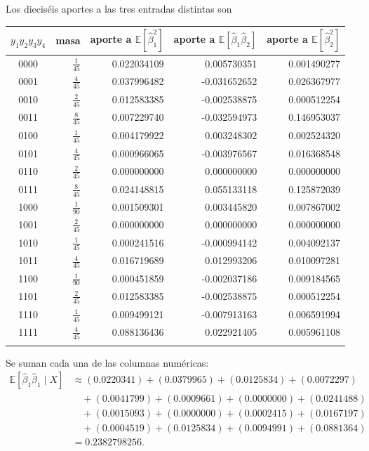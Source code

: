\documentclass[11pt,a4paper]{article}
\newcommand{\E}{\mathbb E}
\begin{document}
Los dieciséis aportes a las tres entradas distintas son
\begin{center}\scriptsize
\begin{tabular}{crrrr}\toprule
\(y_1y_2y_3y_4\)&masa&aporte a \(\E[\widehat\beta_1^2]\)&aporte a \(\E[\widehat\beta_1\widehat\beta_2]\)&aporte a \(\E[\widehat\beta_2^2]\)\\\midrule
0000&$\frac{1}{45}$&0.022034109&0.005730351&0.001490277\\
0001&$\frac{4}{45}$&0.037996482&-0.031652652&0.026367977\\
0010&$\frac{2}{45}$&0.012583385&-0.002538875&0.000512254\\
0011&$\frac{8}{45}$&0.007229740&-0.032594973&0.146953037\\
0100&$\frac{1}{45}$&0.004179922&0.003248302&0.002524320\\
0101&$\frac{4}{45}$&0.000966065&-0.003976567&0.016368548\\
0110&$\frac{2}{45}$&0.000000000&0.000000000&0.000000000\\
0111&$\frac{8}{45}$&0.024148815&0.055133118&0.125872039\\
1000&$\frac{1}{90}$&0.001509301&0.003445820&0.007867002\\
1001&$\frac{2}{45}$&0.000000000&0.000000000&0.000000000\\
1010&$\frac{1}{45}$&0.000241516&-0.000994142&0.004092137\\
1011&$\frac{4}{45}$&0.016719689&0.012993206&0.010097281\\
1100&$\frac{1}{90}$&0.000451859&-0.002037186&0.009184565\\
1101&$\frac{2}{45}$&0.012583385&-0.002538875&0.000512254\\
1110&$\frac{1}{45}$&0.009499121&-0.007913163&0.006591994\\
1111&$\frac{4}{45}$&0.088136436&0.022921405&0.005961108\\
\\\bottomrule\end{tabular}\end{center}
Se suman cada una de las columnas numéricas:
\[
\begin{aligned}
\E[\widehat\beta_1\widehat\beta_1\mid X]&\approx(0.0220341)+(0.0379965)+(0.0125834)+(0.0072297)\\&\quad+(0.0041799)+(0.0009661)+(0.0000000)+(0.0241488)\\&\quad+(0.0015093)+(0.0000000)+(0.0002415)+(0.0167197)\\&\quad+(0.0004519)+(0.0125834)+(0.0094991)+(0.0881364)\\&=0.2382798256.\end{aligned}
\]
\end{document}
